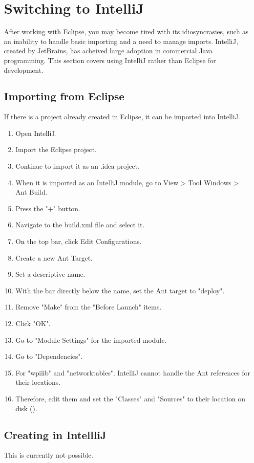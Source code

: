 \documentclass[]{report}
\begin{document}
\section{Switching to IntelliJ}
After working with Eclipse, you may become tired with its idiosyncrasies, such as an inability to handle basic importing and a need to manage imports.
IntelliJ, created by JetBrains, has acheived large adoption in commercial Java programming.
This section covers using IntelliJ rather than Eclipse for development.

\subsection{Importing from Eclipse}
If there is a project already created in Eclipse, it can be imported into IntelliJ.
\begin{enumerate}
\item Open IntelliJ.
\item Import the Eclipse project.
\item Continue to import it as an .idea project.
\item When it is imported as an IntelliJ module, go to View \textgreater{} Tool Windows \textgreater{} Ant Build.
\item Press the "+" button.
\item Navigate to the build.xml file and select it.
\item On the top bar, click Edit Configurations.
\item Create a new Ant Target.
\item Set a descriptive name.
\item With the bar directly below the name, set the Ant target to "deploy".
\item Remove "Make" from the "Before Launch" items.
\item Click "OK".
\item Go to "Module Settings" for the imported module.
\item Go to "Dependencies".
\item For "wpilib" and "networktables", IntelliJ cannot handle the Ant references for their locations.
\item Therefore, edit them and set the "Classes" and "Sources" to their location on disk ().
\end{enumerate}


\subsection{Creating in IntellliJ}
This is currently not possible.
\end{document}
